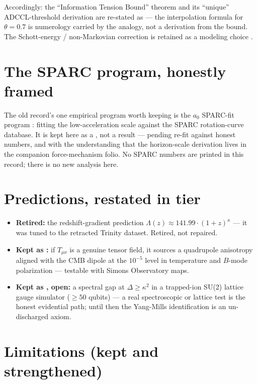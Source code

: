 \documentclass{alienfolio}
\begin{document}
Accordingly: the ``Information Tension Bound'' theorem and its
``unique'' ADCCL-threshold derivation are re-stated as
 --- the interpolation formula
for $\theta = 0.7$ is numerology carried by the analogy, not a
derivation from the bound. The Schott-energy / non-Markovian
correction is retained as a modeling choice .

\section{The SPARC program, honestly framed}
\label{sec:sparc}

The old record's one empirical program worth keeping is the $a_0$
SPARC-fit program : fitting the low-acceleration
scale against the SPARC rotation-curve database. It is kept here as
a , not a result --- pending re-fit against honest
numbers, and with the understanding that the horizon-scale derivation
lives in the companion force-mechanism folio. No SPARC numbers are
printed in this record; there is no new analysis here.

\section{Predictions, restated in tier}
\label{sec:predictions}

\begin{itemize}
\item \textbf{Retired:} the redshift-gradient prediction
$\Lambda(z) \approx 141.99\cdot(1+z)^\kappa$ --- it was tuned to the
retracted Trinity dataset. Retired, not repaired.
\item \textbf{Kept as :} if $T_{\mu\nu}$ is a
genuine tensor field, it sources a quadrupole anisotropy aligned
with the CMB dipole at the $10^{-5}$ level in temperature and
$B$-mode polarization --- testable with Simons Observatory maps.
\item \textbf{Kept as , open:} a spectral gap at
$\Delta \ge \kappa^2$ in a trapped-ion SU(2) lattice gauge simulator
($\ge 50$ qubits) --- a real spectroscopic or lattice test is the
honest evidential path; until then the Yang-Mills identification is
an un-discharged axiom.
\end{itemize}

\section{Limitations (kept and strengthened)}
\label{sec:limits}
\end{document}
